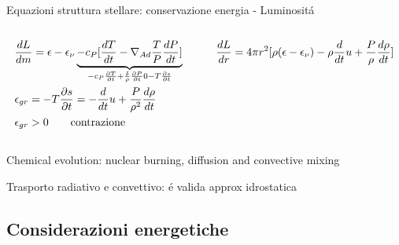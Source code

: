 \begin{frame}{Equazioni struttura stellare: conservazione energia - Luminosit\'a}
\begin{columns}[T]
\begin{column}{0.4\textwidth}
\begin{align*}
&\TDy{m}{L}=\epsilon-\epsilon_{\nu} \underbrace{-c_P[\TDy{t}{T}-\nad\frac{T}{P}\TDy{t}{P}]}_{-c_P\PDy{t}{T}+\frac{\delta}{\rho}\PDy{t}{P}0-T\PDy{t}{s}}\\
&\epsilon_{gr}=-T\PDy{t}{s}=-\TDof{t}u+\frac{P}{\rho^2}\TDy{t}{\rho}\\
&\epsilon_{gr}>0\tag*{contrazione}
\end{align*}
\end{column}\begin{column}{0.6\textwidth}
\begin{align*}
&\TDy{r}{L}=4\pi r^2[\rho(\epsilon-\epsilon_{\nu})-\rho\TDof{t}u+\frac{P}{\rho}\TDy{t}{\rho}]\\
&
\end{align*}
\end{column}
\end{columns}
\end{frame}

\begin{wordonframe}{Chemical evolution: nuclear burning, diffusion and convective mixing}\

\end{wordonframe}

\begin{frame}{Trasporto radiativo e convettivo: \'e valida approx idrostatica}

\end{frame}

\subsection{Considerazioni energetiche}

